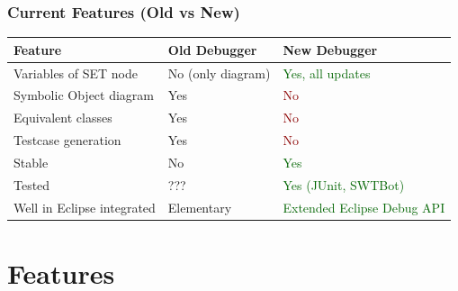 \documentclass[accentcolor=tud9d,colorbacktitle,inverttitle,landscape,english,presentation,t]{tudbeamer}
\begin{document}
   \begin{frame}[t]
		\frametitle{Current Features (Old vs New)}
      
      \begin{table}
         \centering
            \begin{tabular}{|l|l|l|}
               \hline
               Feature & Old Debugger & New Debugger \\
               \hline
               \hline
               Variables of SET node & No (only diagram) & \textcolor{darkgreen}{Yes, all updates} \\
               Symbolic Object diagram & Yes & \textcolor{darkred}{No} \\
               Equivalent classes & Yes & \textcolor{darkred}{No} \\
               \hline
               Testcase generation & Yes & \textcolor{darkred}{No} \\
               \hline
               Stable & No & \textcolor{darkgreen}{Yes} \\
               Tested & ??? & \textcolor{darkgreen}{Yes (JUnit, SWTBot)} \\
               Well in Eclipse integrated & Elementary & \textcolor{darkgreen}{Extended Eclipse Debug API} \\
               \hline
            \end{tabular}
      \end{table}
	\end{frame}
   \section{Features}
\end{document}
